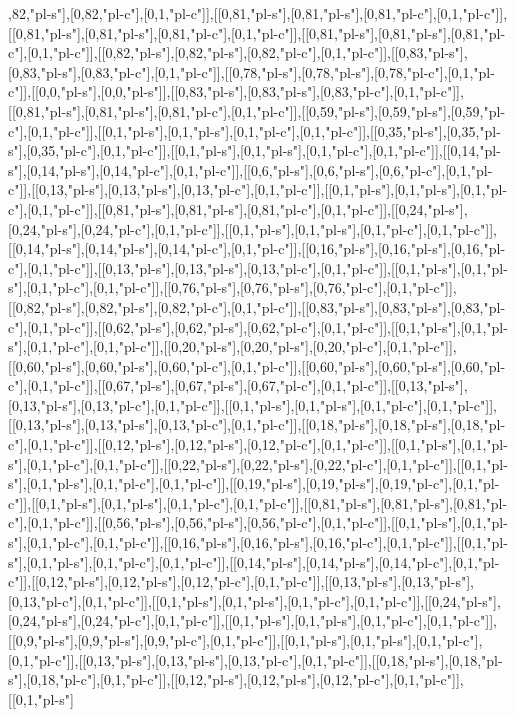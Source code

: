 ,82,"pl-s"],[0,82,"pl-c"],[0,1,"pl-c"]],[[0,81,"pl-s"],[0,81,"pl-s"],[0,81,"pl-c"],[0,1,"pl-c"]],[[0,81,"pl-s"],[0,81,"pl-s"],[0,81,"pl-c"],[0,1,"pl-c"]],[[0,81,"pl-s"],[0,81,"pl-s"],[0,81,"pl-c"],[0,1,"pl-c"]],[[0,82,"pl-s"],[0,82,"pl-s"],[0,82,"pl-c"],[0,1,"pl-c"]],[[0,83,"pl-s"],[0,83,"pl-s"],[0,83,"pl-c"],[0,1,"pl-c"]],[[0,78,"pl-s"],[0,78,"pl-s"],[0,78,"pl-c"],[0,1,"pl-c"]],[[0,0,"pl-s"],[0,0,"pl-s"]],[[0,83,"pl-s"],[0,83,"pl-s"],[0,83,"pl-c"],[0,1,"pl-c"]],[[0,81,"pl-s"],[0,81,"pl-s"],[0,81,"pl-c"],[0,1,"pl-c"]],[[0,59,"pl-s"],[0,59,"pl-s"],[0,59,"pl-c"],[0,1,"pl-c"]],[[0,1,"pl-s"],[0,1,"pl-s"],[0,1,"pl-c"],[0,1,"pl-c"]],[[0,35,"pl-s"],[0,35,"pl-s"],[0,35,"pl-c"],[0,1,"pl-c"]],[[0,1,"pl-s"],[0,1,"pl-s"],[0,1,"pl-c"],[0,1,"pl-c"]],[[0,14,"pl-s"],[0,14,"pl-s"],[0,14,"pl-c"],[0,1,"pl-c"]],[[0,6,"pl-s"],[0,6,"pl-s"],[0,6,"pl-c"],[0,1,"pl-c"]],[[0,13,"pl-s"],[0,13,"pl-s"],[0,13,"pl-c"],[0,1,"pl-c"]],[[0,1,"pl-s"],[0,1,"pl-s"],[0,1,"pl-c"],[0,1,"pl-c"]],[[0,81,"pl-s"],[0,81,"pl-s"],[0,81,"pl-c"],[0,1,"pl-c"]],[[0,24,"pl-s"],[0,24,"pl-s"],[0,24,"pl-c"],[0,1,"pl-c"]],[[0,1,"pl-s"],[0,1,"pl-s"],[0,1,"pl-c"],[0,1,"pl-c"]],[[0,14,"pl-s"],[0,14,"pl-s"],[0,14,"pl-c"],[0,1,"pl-c"]],[[0,16,"pl-s"],[0,16,"pl-s"],[0,16,"pl-c"],[0,1,"pl-c"]],[[0,13,"pl-s"],[0,13,"pl-s"],[0,13,"pl-c"],[0,1,"pl-c"]],[[0,1,"pl-s"],[0,1,"pl-s"],[0,1,"pl-c"],[0,1,"pl-c"]],[[0,76,"pl-s"],[0,76,"pl-s"],[0,76,"pl-c"],[0,1,"pl-c"]],[[0,82,"pl-s"],[0,82,"pl-s"],[0,82,"pl-c"],[0,1,"pl-c"]],[[0,83,"pl-s"],[0,83,"pl-s"],[0,83,"pl-c"],[0,1,"pl-c"]],[[0,62,"pl-s"],[0,62,"pl-s"],[0,62,"pl-c"],[0,1,"pl-c"]],[[0,1,"pl-s"],[0,1,"pl-s"],[0,1,"pl-c"],[0,1,"pl-c"]],[[0,20,"pl-s"],[0,20,"pl-s"],[0,20,"pl-c"],[0,1,"pl-c"]],[[0,60,"pl-s"],[0,60,"pl-s"],[0,60,"pl-c"],[0,1,"pl-c"]],[[0,60,"pl-s"],[0,60,"pl-s"],[0,60,"pl-c"],[0,1,"pl-c"]],[[0,67,"pl-s"],[0,67,"pl-s"],[0,67,"pl-c"],[0,1,"pl-c"]],[[0,13,"pl-s"],[0,13,"pl-s"],[0,13,"pl-c"],[0,1,"pl-c"]],[[0,1,"pl-s"],[0,1,"pl-s"],[0,1,"pl-c"],[0,1,"pl-c"]],[[0,13,"pl-s"],[0,13,"pl-s"],[0,13,"pl-c"],[0,1,"pl-c"]],[[0,18,"pl-s"],[0,18,"pl-s"],[0,18,"pl-c"],[0,1,"pl-c"]],[[0,12,"pl-s"],[0,12,"pl-s"],[0,12,"pl-c"],[0,1,"pl-c"]],[[0,1,"pl-s"],[0,1,"pl-s"],[0,1,"pl-c"],[0,1,"pl-c"]],[[0,22,"pl-s"],[0,22,"pl-s"],[0,22,"pl-c"],[0,1,"pl-c"]],[[0,1,"pl-s"],[0,1,"pl-s"],[0,1,"pl-c"],[0,1,"pl-c"]],[[0,19,"pl-s"],[0,19,"pl-s"],[0,19,"pl-c"],[0,1,"pl-c"]],[[0,1,"pl-s"],[0,1,"pl-s"],[0,1,"pl-c"],[0,1,"pl-c"]],[[0,81,"pl-s"],[0,81,"pl-s"],[0,81,"pl-c"],[0,1,"pl-c"]],[[0,56,"pl-s"],[0,56,"pl-s"],[0,56,"pl-c"],[0,1,"pl-c"]],[[0,1,"pl-s"],[0,1,"pl-s"],[0,1,"pl-c"],[0,1,"pl-c"]],[[0,16,"pl-s"],[0,16,"pl-s"],[0,16,"pl-c"],[0,1,"pl-c"]],[[0,1,"pl-s"],[0,1,"pl-s"],[0,1,"pl-c"],[0,1,"pl-c"]],[[0,14,"pl-s"],[0,14,"pl-s"],[0,14,"pl-c"],[0,1,"pl-c"]],[[0,12,"pl-s"],[0,12,"pl-s"],[0,12,"pl-c"],[0,1,"pl-c"]],[[0,13,"pl-s"],[0,13,"pl-s"],[0,13,"pl-c"],[0,1,"pl-c"]],[[0,1,"pl-s"],[0,1,"pl-s"],[0,1,"pl-c"],[0,1,"pl-c"]],[[0,24,"pl-s"],[0,24,"pl-s"],[0,24,"pl-c"],[0,1,"pl-c"]],[[0,1,"pl-s"],[0,1,"pl-s"],[0,1,"pl-c"],[0,1,"pl-c"]],[[0,9,"pl-s"],[0,9,"pl-s"],[0,9,"pl-c"],[0,1,"pl-c"]],[[0,1,"pl-s"],[0,1,"pl-s"],[0,1,"pl-c"],[0,1,"pl-c"]],[[0,13,"pl-s"],[0,13,"pl-s"],[0,13,"pl-c"],[0,1,"pl-c"]],[[0,18,"pl-s"],[0,18,"pl-s"],[0,18,"pl-c"],[0,1,"pl-c"]],[[0,12,"pl-s"],[0,12,"pl-s"],[0,12,"pl-c"],[0,1,"pl-c"]],[[0,1,"pl-s"]